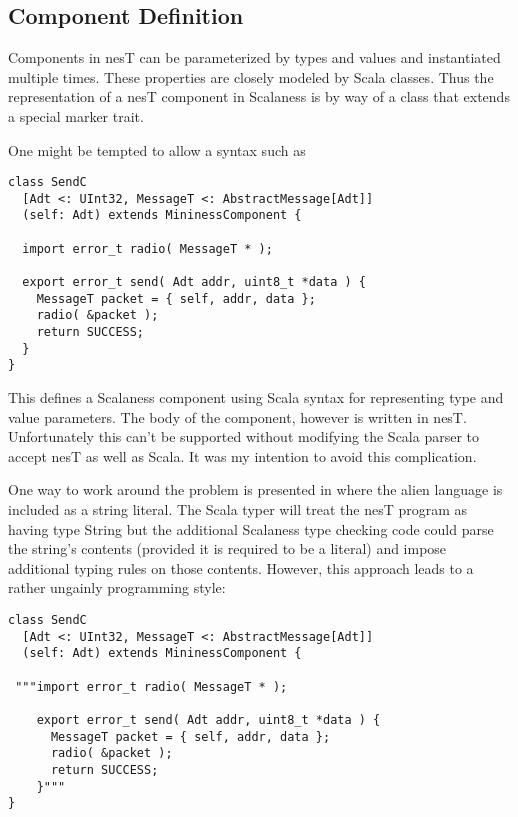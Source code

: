 \subsection{Component Definition}
\label{section-component-definition}

Components in nesT can be parameterized by types and values and instantiated multiple times.
These properties are closely modeled by Scala classes. Thus the representation of a nesT
component in Scalaness is by way of a class that extends a special marker trait.

One might be tempted to allow a syntax such as

\singlespace
\begin{lstlisting}[language=scalaness]
class SendC
  [Adt <: UInt32, MessageT <: AbstractMessage[Adt]]
  (self: Adt) extends MininessComponent {

  import error_t radio( MessageT * );

  export error_t send( Adt addr, uint8_t *data ) {
    MessageT packet = { self, addr, data };
    radio( &packet );
    return SUCCESS;
  }
}
\end{lstlisting}
\primaryspacing

This defines a Scalaness component using Scala syntax for representing type and value
parameters. The body of the component, however is written in nesT. Unfortunately this can't be
supported without modifying the Scala parser to accept nesT as well as Scala. It was my
intention to avoid this complication.

One way to work around the problem is presented in \cite{Garcia-Scala-Query} where the alien
language is included as a string literal. The Scala typer will treat the nesT program as having
type String but the additional Scalaness type checking code could parse the string's contents
(provided it is required to be a literal) and impose additional typing rules on those contents.
However, this approach leads to a rather ungainly programming style:

\singlespace
\begin{lstlisting}[language=scalaness]
class SendC
  [Adt <: UInt32, MessageT <: AbstractMessage[Adt]]
  (self: Adt) extends MininessComponent {

 """import error_t radio( MessageT * );

    export error_t send( Adt addr, uint8_t *data ) {
      MessageT packet = { self, addr, data };
      radio( &packet );
      return SUCCESS;
    }"""
}
\end{lstlisting}
\primaryspacing


